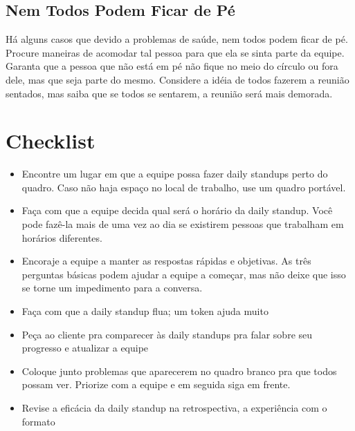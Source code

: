 \documentclass[a4paper, 10pt, font=plain]{abnt}
\begin{document}
\subsection{Nem Todos Podem Ficar de Pé}
Há alguns casos que devido a problemas de saúde, nem todos podem ficar de pé. Procure maneiras de acomodar tal pessoa para que ela se sinta parte da equipe. Garanta que a pessoa que não está em pé não fique no meio do círculo ou fora dele, mas que seja parte do mesmo. Considere a idéia de todos fazerem a reunião sentados, mas saiba que se todos se sentarem, a reunião será mais demorada.


\section{Checklist}

\begin{itemize}
\item Encontre um lugar em que a equipe possa fazer daily standups perto do quadro. Caso não haja espaço no local de trabalho, use um quadro portável.

\item Faça com que a equipe decida qual será o horário da daily standup. Você pode fazê-la mais de uma vez ao dia se existirem pessoas que trabalham em horários diferentes.

\item Encoraje a equipe a manter as respostas rápidas e objetivas. As três perguntas básicas podem ajudar a equipe a começar, mas não deixe que isso se torne um impedimento para a conversa.

\item Faça com que a daily standup flua; um token ajuda muito

\item Peça ao cliente pra comparecer às daily standups pra falar sobre seu progresso e atualizar a equipe

\item Coloque junto problemas que aparecerem no quadro branco pra que todos possam ver. Priorize com a equipe e em seguida siga em frente.

\item Revise a eficácia da daily standup na retrospectiva, a experiência com o formato

\end{itemize}
\end{document}
